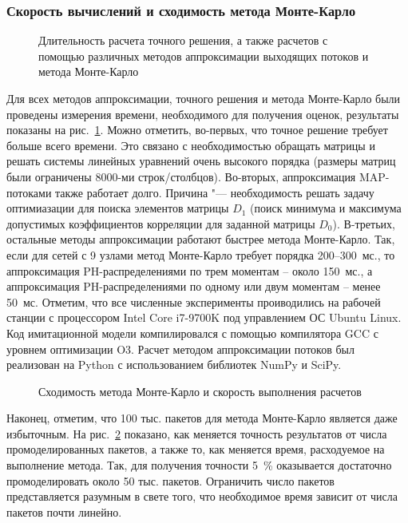 \subsubsection{Скорость вычислений и сходимость метода Монте-Карло}

\begin{figure}[h]
  \caption{Длительность расчета точного решения, а также расчетов с помощью различных методов аппроксимации выходящих потоков и метода Монте-Карло}
  \label{fig:ch4_approximations_elapsed}
\end{figure}

Для всех методов аппроксимации, точного решения и метода Монте-Карло были проведены измерения времени, необходимого для получения оценок, результаты показаны на рис.~\ref{fig:ch4_approximations_elapsed}. Можно отметить, во-первых, что точное решение требует больше всего времени. Это связано с необходимостью обращать матрицы и решать системы линейных уравнений очень высокого порядка (размеры матриц были ограничены 8000-ми строк/столбцов). Во-вторых, аппроксимация MAP-потоками также работает долго. Причина "--- необходимость решать задачу оптимиазации для поиска элементов матрицы $D_1$ (поиск минимума и максимума допустимых коэффициентов корреляции для заданной матрицы $D_0$). В-третьих, остальные методы аппроксимации работают быстрее метода Монте-Карло. Так, если для сетей с 9 узлами метод Монте-Карло требует порядка 200--300~мс., то аппроксимация PH-распределениями по трем моментам -- около 150~мс., а аппроксимация PH-распределениями по одному или двум моментам -- менее 50~мс. Отметим, что все численные эксперименты проиводились на рабочей станции с процессором Intel Core i7-9700K под управлением ОС Ubuntu Linux. Код имитационной модели компилировался с помощью компилятора GCC с уровнем оптимизации O3. Расчет методом аппроксимации потоков был реализован на Python с использованием библиотек NumPy и SciPy.

\begin{figure}[h]
  \caption{Сходимость метода Монте-Карло и скорость выполнения расчетов}
  \label{fig:ch4_monte_carlo_performance}
\end{figure}

Наконец, отметим, что 100 тыс. пакетов для метода Монте-Карло является даже избыточным. На рис.~\ref{fig:ch4_monte_carlo_performance} показано, как меняется точность результатов от числа промоделированных пакетов, а также то, как меняется время, расходуемое на выполнение метода. Так, для получения точности 5~\% оказывается достаточно промоделировать около 50 тыс. пакетов. Ограничить число пакетов представляется разумным в свете того, что необходимое время зависит от числа пакетов почти линейно.




